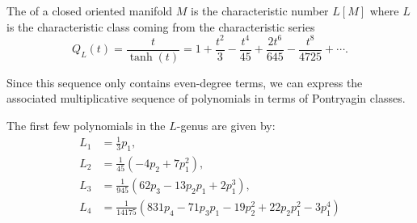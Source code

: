 \begin{definition}
	The  of a closed oriented manifold $M$ is the characteristic number $L[M]$ where $L$ is the characteristic class coming from the characteristic series
	\[
		Q_{L}(t) = \frac{t}{\tanh(t)}=1+\frac{t^2}{3} - \frac{t^4}{45} + \frac{2t^6}{645}-\frac{t^8}{4725}+\cdots.
	\]
\end{definition}

Since this sequence only contains even-degree terms, we can express the associated multiplicative sequence of polynomials in terms of Pontryagin classes.

\begin{example}\label{example:L-genus}
	The first few polynomials in the $L$-genus are given by:
	\[
		\begin{aligned}
			L_1 &= \frac{1}{3}p_1,\\
			L_2 &= \frac{1}{45}(-4p_2 + 7p_1^2),\\
			L_3 &= \frac{1}{945}(62p_3-13p_2p_1+2p_1^3),\\
			L_4 &= \frac{1}{14175}(831p_4-71p_3p_1-19p_2^2 + 22p_2p_1^2 - 3p_1^4)
		\end{aligned}
	\]
\end{example}

